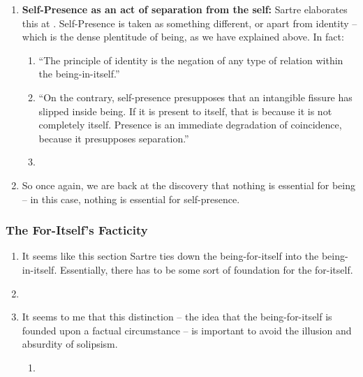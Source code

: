 \begin{enumerate}
\begin{enumerate}
  \end{enumerate}
  \item \textbf{Self-Presence as an act of separation from the self:} Sartre elaborates this at \autocite[127]{sartre}. Self-Presence is taken as something different, or apart from identity -- which is the dense plentitude of being, as we have explained above. In fact:
  \begin{enumerate}
    \item \enquote{The principle of identity is the negation of any type of relation within the being-in-itself.}
    \item \enquote{On the contrary, self-presence presupposes that an intangible fissure has slipped inside being. If it is present to itself, that is because it is not completely itself. Presence is an immediate degradation of coincidence, because it presupposes separation.}
    \item {}
  \end{enumerate}
  \item So once again, we are back at the discovery that nothing is essential for being -- in this case, nothing is essential for self-presence.
\end{enumerate}

\subsubsection{The For-Itself's Facticity}

\begin{enumerate}
  \item It seems like this section Sartre ties down the being-for-itself into the being-in-itself. Essentially, there has to be some sort of foundation for the for-itself.
  \item {}
  \item It seems to me that this distinction -- the idea that the being-for-itself is founded upon a factual circumstance -- is important to avoid the illusion and absurdity of solipsism.
  \begin{enumerate}
    \item {}
  \end{enumerate}
\end{enumerate}

